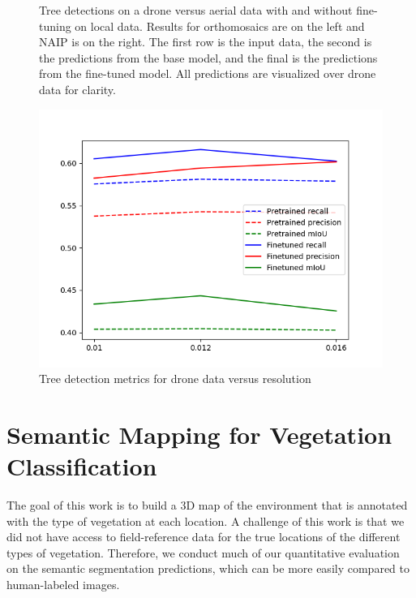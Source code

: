 \begin{figure}[H]
    \hfill
    \caption{Tree detections on a drone versus aerial data with and without fine-tuning on local data. Results for orthomosaics are on the left and NAIP is on the right. The first row is the input data, the second is the predictions from the base model, and the final is the predictions from the fine-tuned model. All predictions are visualized over drone data for clarity.
    }
    \label{fig:results:tree_det}
\end{figure}

\begin{figure}
    \centering
    \includegraphics{figs/results/tree_detections/metrics.png}
    \caption{Tree detection metrics for drone data versus resolution}
    \label{fig:results:drone_resolution}
\end{figure}


\section{Semantic Mapping for Vegetation Classification}
The goal of this work is to build a 3D map of the environment that is annotated with the type of vegetation at each location. A challenge of this work is that we did not have access to field-reference data for the true locations of the different types of vegetation. Therefore, we conduct much of our quantitative evaluation on the semantic segmentation predictions, which can be more easily compared to human-labeled images. 

